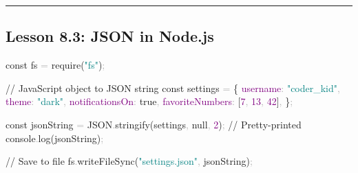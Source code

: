 \documentclass[
  justified,
  openright,
]{tufte-book}
\newcommand{\BuiltInTok}[1]{#1}
\newcommand{\CommentTok}[1]{\textcolor{MidGray}{#1}}
\newcommand{\DataTypeTok}[1]{\textcolor{Purple}{#1}}
\newcommand{\DecValTok}[1]{\textcolor{Purple}{#1}}
\newcommand{\FunctionTok}[1]{\textcolor{BrandBlue}{#1}}
\newcommand{\KeywordTok}[1]{\textcolor{BrandBlue}{#1}}
\newcommand{\NormalTok}[1]{#1}
\newcommand{\OperatorTok}[1]{\textcolor{DarkGray}{#1}}
\newcommand{\PreprocessorTok}[1]{\textcolor{BrandAccent}{#1}}
\newcommand{\StringTok}[1]{\textcolor{Teal}{#1}}
\newenvironment{Shaded}{%
  \begin{snugshade}
}{%
  \end{snugshade}
}
\begin{document}
\begin{center}\rule{0.5\linewidth}{0.5pt}\end{center}

\subsection{Lesson 8.3: JSON in
Node.js}\label{lesson-8.3-json-in-node.js}

\begin{Shaded}
\begin{Highlighting}[]
\KeywordTok{const}\NormalTok{ fs }\OperatorTok{=} \PreprocessorTok{require}\NormalTok{(}\StringTok{"fs"}\NormalTok{)}\OperatorTok{;}

\CommentTok{// JavaScript object to JSON string}
\KeywordTok{const}\NormalTok{ settings }\OperatorTok{=}\NormalTok{ \{}
  \DataTypeTok{username}\OperatorTok{:} \StringTok{"coder\_kid"}\OperatorTok{,}
  \DataTypeTok{theme}\OperatorTok{:} \StringTok{"dark"}\OperatorTok{,}
  \DataTypeTok{notificationsOn}\OperatorTok{:} \KeywordTok{true}\OperatorTok{,}
  \DataTypeTok{favoriteNumbers}\OperatorTok{:}\NormalTok{ [}\DecValTok{7}\OperatorTok{,} \DecValTok{13}\OperatorTok{,} \DecValTok{42}\NormalTok{]}\OperatorTok{,}
\NormalTok{\}}\OperatorTok{;}

\KeywordTok{const}\NormalTok{ jsonString }\OperatorTok{=} \BuiltInTok{JSON}\OperatorTok{.}\FunctionTok{stringify}\NormalTok{(settings}\OperatorTok{,} \KeywordTok{null}\OperatorTok{,} \DecValTok{2}\NormalTok{)}\OperatorTok{;} \CommentTok{// Pretty{-}printed}
\BuiltInTok{console}\OperatorTok{.}\FunctionTok{log}\NormalTok{(jsonString)}\OperatorTok{;}

\CommentTok{// Save to file}
\NormalTok{fs}\OperatorTok{.}\FunctionTok{writeFileSync}\NormalTok{(}\StringTok{"settings.json"}\OperatorTok{,}\NormalTok{ jsonString)}\OperatorTok{;}


\end{Highlighting}
\end{Shaded}
\end{document}
